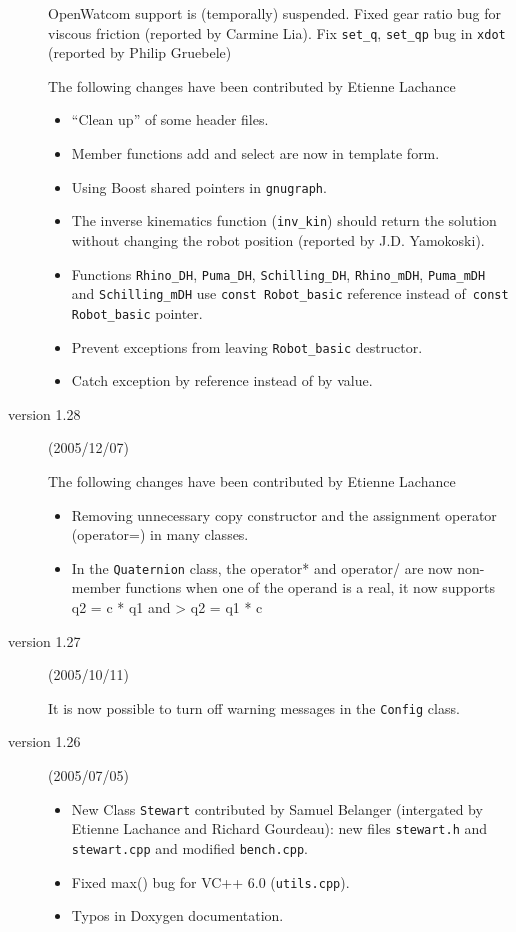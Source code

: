 \documentclass[11pt,fleqn,letterpaper]{report}
\begin{document}
\begin{description}
  \textsf{OpenWatcom} support is (temporally) suspended. Fixed gear
  ratio bug for viscous friction (reported by Carmine Lia). Fix
  \texttt{set\_q}, \texttt{set\_qp} bug in \texttt{xdot} (reported by
  Philip Gruebele)

  The following changes have been contributed by Etienne Lachance
  \begin{itemize}
  \item ``Clean up'' of some header files.
  \item Member functions add and select are now in template form.
  \item Using \textsf{Boost} shared pointers in \texttt{gnugraph}.
  \item The inverse kinematics function (\texttt{inv\_kin}) should
    return the solution without changing the robot position (reported
    by J.D. Yamokoski).
  \item Functions \texttt{Rhino\_DH}, \texttt{Puma\_DH},
    \texttt{Schilling\_DH}, \texttt{Rhino\_mDH}, \texttt{Puma\_mDH}
    and \texttt{Schilling\_mDH} use \texttt{const Robot\_basic}
    reference instead of\texttt{ const Robot\_basic} pointer.
  \item Prevent exceptions from leaving \texttt{Robot\_basic} destructor.
  \item Catch exception by reference instead of by value.
  \end{itemize}
  
\item[version 1.28] (2005/12/07)

  The following changes have been contributed by Etienne Lachance
  \begin{itemize}
  \item Removing unnecessary copy constructor and the assignment
    operator (operator=) in many classes.
  \item In the \texttt{Quaternion} class, the operator* and operator/
    are now non-member functions when one of the operand is a real, it
    now supports q2 = c * q1 and > q2 = q1 * c
  \end{itemize}

\item[version 1.27] (2005/10/11)

  It is now possible to turn off warning messages in the
  \texttt{Config} class.
  
\item[version 1.26] (2005/07/05)
  \begin{itemize}
  \item New Class \texttt{Stewart} contributed by Samuel Belanger
    (intergated by Etienne Lachance and Richard Gourdeau): new files
    \texttt{stewart.h} and \texttt{stewart.cpp} and modified
    \texttt{bench.cpp}.
  \item Fixed max() bug for VC++ 6.0 (\texttt{utils.cpp}).
  \item Typos in Doxygen documentation.
  \end{itemize}
  

\end{description}
\end{document}

